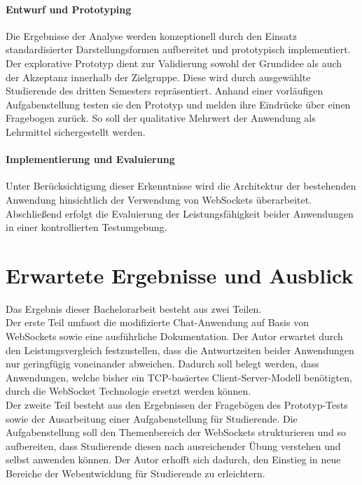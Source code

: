\documentclass[11pt,a4paper,titlepage]{scrartcl}
\numberwithin{equation}{section}
\begin{document}
 \paragraph{Entwurf und Prototyping}Die Ergebnisse der Analyse werden konzeptionell durch den Einsatz standardisierter Darstellungsformen aufbereitet und prototypisch implementiert. Der explorative Prototyp dient zur Validierung sowohl der Grundidee als auch der Akzeptanz innerhalb der Zielgruppe. Diese wird durch ausgewählte Studierende des dritten Semesters repräsentiert. Anhand einer vorläufigen Aufgabenstellung testen sie den Prototyp und melden ihre Eindrücke über einen Fragebogen zurück. So soll der qualitative Mehrwert der Anwendung als Lehrmittel sichergestellt werden.
 \paragraph{Implementierung und Evaluierung}
Unter Berücksichtigung dieser Erkenntnisse wird die Architektur der bestehenden Anwendung hinsichtlich der Verwendung von WebSockets überarbeitet. Abschließend erfolgt die Evaluierung der Leistungsfähigkeit beider Anwendungen in einer kontrollierten Testumgebung.


\section{Erwartete Ergebnisse und Ausblick}
Das Ergebnis dieser Bachelorarbeit besteht aus zwei Teilen.\\

 Der erste Teil umfasst die modifizierte Chat-Anwendung auf Basis von WebSockets sowie eine ausführliche Dokumentation. Der Autor erwartet durch den Leistungsvergleich festzustellen, dass die Antwortzeiten beider Anwendungen nur geringfügig voneinander abweichen. Dadurch soll belegt werden, dass Anwendungen, welche bisher ein TCP-basiertes Client-Server-Modell benötigten, durch die WebSocket Technologie ersetzt werden können.\\

Der zweite Teil besteht aus den Ergebnissen der Fragebögen des Prototyp-Tests sowie der Ausarbeitung einer Aufgabenstellung für Studierende. Die Aufgabenstellung soll den Themenbereich der WebSockets strukturieren und so aufbereiten, dass Studierende diesen nach ausreichender Übung verstehen und selbst anwenden können. Der Autor erhofft sich dadurch, den Einstieg in neue Bereiche der Webentwicklung für Studierende zu erleichtern.\\ 		
\end{document}
